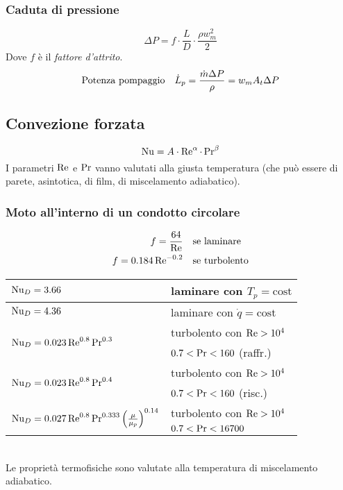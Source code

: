 \subsubsection{Caduta di pressione}
\[ \Delta P = f \cdot \frac{L}{D} \cdot \frac{\rho w_m^2}{2} \]
Dove $f$ è il \emph{fattore d'attrito}.
\[ \qq*{Potenza pompaggio} \dot{L}_p = \frac{\dot{m} \Delta P}{\rho} = w_m A_t \Delta P \]

\subsection{Convezione forzata}
\[ \operatorname{Nu} = A \cdot \operatorname{Re}^\alpha \cdot \operatorname{Pr}^\beta \]
I parametri $\operatorname{Re}$ e $\operatorname{Pr}$ vanno valutati alla giusta temperatura (che può essere di parete, asintotica, di film, di miscelamento adiabatico).

\subsubsection{Moto all'interno di un condotto circolare}
\begin{align*}
    f = \frac{64}{\operatorname{Re}} & \quad \text{se laminare} \\
    f = 0.184 \operatorname{Re}^{-0.2} & \quad \text{se turbolento}\\
\end{align*}
\begin{tabular}{ll}
    \toprule
    $\operatorname{Nu}_{D} = 3.66$ & laminare con $T_p = \text{cost}$ \\
    \midrule
    $\operatorname{Nu}_{D} = 4.36$ & laminare con $\dot{q} = \text{cost}$ \\
    \midrule
    \multirow{2}{*}{$\operatorname{Nu}_{D} = 0.023 \operatorname{Re}^{0.8} \operatorname{Pr}^{0.3}$} & turbolento con $\operatorname{Re} > 10^4$ \\
    & $0.7 < \operatorname{Pr} < 160$ (raffr.)\\
    \midrule
    \multirow{2}{*}{$\operatorname{Nu}_{D} = 0.023 \operatorname{Re}^{0.8} \operatorname{Pr}^{0.4}$} & turbolento con $\operatorname{Re} > 10^4$ \\
    & $0.7 < \operatorname{Pr} < 160$ (risc.)\\
    \midrule
    \multirow{2}{*}{$\operatorname{Nu}_{D} = 0.027 \operatorname{Re}^{0.8} \operatorname{Pr}^{0.333} \qty(\frac{\mu}{\mu_p})^{0.14}$} & turbolento con $\operatorname{Re} > 10^4$ \\
    & $0.7 < \operatorname{Pr} < 16700$\\
    \midrule
\end{tabular}\\
Le proprietà termofisiche sono valutate alla temperatura di miscelamento adiabatico.


